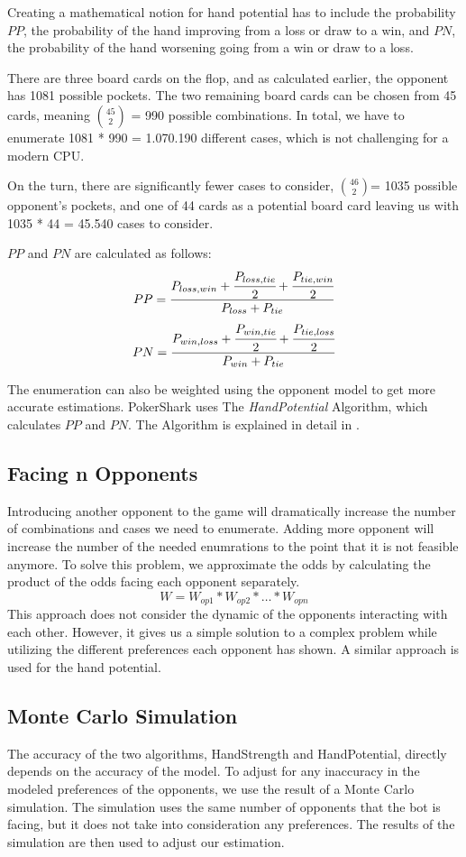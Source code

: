 Creating a mathematical notion for hand potential has to include the probability $PP$, the probability of the hand improving from a loss or draw to a win, and $PN$, the probability of the hand worsening going from a win or draw to a loss.

There are three board cards on the flop, and as calculated earlier, the opponent has 1081 possible pockets. The two remaining board cards can be chosen from 45 cards, meaning ${45 \choose 2}$ = 990 possible combinations. In total, we have to enumerate 1081 * 990 = 1.070.190 different cases, which is not challenging for a modern CPU.

On the turn, there are significantly fewer cases to consider, ${46 \choose 2}$=  1035 possible opponent's pockets, and one of 44 cards as a potential board card leaving us with 1035 * 44 = 45.540 cases to consider.

$PP$ and $PN$ are calculated as follows:
$$PP =\frac{P_{loss,win} + \cfrac{P_{loss,tie}}{2} + \cfrac{P_{tie,win}}{2}}{P_{loss} + P_{tie}}$$
$$PN =\frac{P_{win,loss} + \cfrac{P_{win,tie}}{2} + \cfrac{P_{tie,loss}}{2}}{P_{win} + P_{tie}}$$

The enumeration can also be weighted using the opponent model to get more accurate estimations. PokerShark uses The \textit{HandPotential} Algorithm, which calculates $PP$ and $PN$. The Algorithm is explained in detail in \cite{papp_dealing_1998}.

\subsection{Facing n Opponents}

Introducing another opponent to the game will dramatically increase the number of combinations and cases we need to enumerate. Adding more opponent will increase the number of the needed enumrations to the point that it is not feasible anymore. To solve this problem, we approximate the odds by calculating the product of the odds facing each opponent separately.
$$W = W_{op1} * W_{op2} * \dots * W_{opn}$$
This approach does not consider the dynamic of the opponents interacting with each other. However, it gives us a simple solution to a complex problem while utilizing the different preferences each opponent has shown. A similar approach is used for the hand potential.


\subsection{Monte Carlo Simulation}
The accuracy of the two algorithms, HandStrength and HandPotential, directly depends on the accuracy of the model. To adjust for any inaccuracy in the modeled preferences of the opponents, we use the result of a Monte Carlo simulation. The simulation uses the same number of opponents that the bot is facing, but it does not take into consideration any preferences. The results of the simulation are then used to adjust our estimation.

